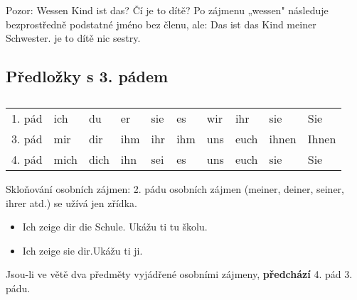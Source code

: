       Pozor: Wessen Kind ist das? Čí je to dítě? Po zájmenu „wessen" následuje bezprostředně podstatné 
      jméno bez členu, ale: Das ist das Kind meiner Schwester. je to dítě nic sestry.
      
    \subsection*{Předložky s 3. pádem}
      \begin{table}[ht!]   %
        \centering
        \begin{tabular}{l|lllllllll}
          \hline
            1. pád & ich  & du   & er  & sie & es  & wir & ihr  & sie   & Sie   \\
            3. pád & mir  & dir  & ihm & ihr & ihm & uns & euch & ihnen & Ihnen \\
            4. pád & mich & dich & ihn & sei & es  & uns & euch & sie   & Sie   \\
          \hline
        \end{tabular}
        \caption*{ }
      \end{table}
      Skloňování osobních zájmen: 2. pádu osobních zájmen (meiner, deiner, seiner, ihrer atd.) se 
      užívá jen zřídka.
      \begin{itemize}\addtolength{\itemsep}{-0.5\baselineskip}
        \item Ich zeige dir die Schule. Ukážu ti tu školu.
        \item Ich zeige sie dir.Ukážu ti ji.
      \end{itemize}     
      Jsou-li ve větě dva předměty vyjádřené osobními zájmeny, \textbf{předchází} 4. pád 3. pádu.
  
